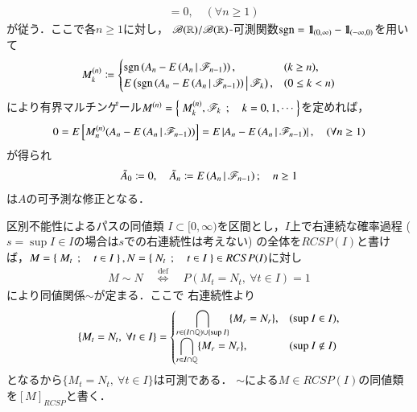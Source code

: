 \begin{prf}
\begin{align}
			&= 0,
			\quad (\forall n \geq 1)
		\end{align}
		が従う．ここで各$n \geq 1$に対し，
		$\mathscr{B}(\mathbb{R})/\mathscr{B}(\mathbb{R})$-可測関数$\operatorname{sgn} = \mbox{1}\hspace{-0.25em}\mbox{l}_{(0,\infty)} - \mbox{1}\hspace{-0.25em}\mbox{l}_{(-\infty,0)}$を用いて
		\begin{align}
			M^{(n)}_k \coloneqq 
			\begin{cases}
				\operatorname{sgn}\left( A_n - E\left( A_n \, \middle|\, \mathscr{F}_{n-1} \right) \right), & (k \geq n), \\
				E\left( \operatorname{sgn}\left( A_n - E\left( A_n \, \middle|\, \mathscr{F}_{n-1} \right) \right) \, \middle|\, \mathscr{F}_k \right), & (0 \leq k < n)
			\end{cases}
		\end{align}
		により有界マルチンゲール$M^{(n)} = \left\{\ M^{(n)}_k,\mathscr{F}_k\ \, ; \quad k=0,1,\cdots\ \right\}$を定めれば，
		\begin{align}
			0 = E\left[ M^{(n)}_n(A_n - E\left( A_n \, \middle|\, \mathscr{F}_{n-1} \right)) \right] 
			= E\left| A_n - E\left( A_n \, \middle|\, \mathscr{F}_{n-1} \right) \right|,
			\quad (\forall n \geq 1)
		\end{align}
		が得られ
		\begin{align}
			\tilde{A}_0 \coloneqq 0,
			\quad \tilde{A}_n \coloneqq E\left( A_n \, \middle|\, \mathscr{F}_{n-1} \right); \quad n \geq 1
		\end{align}
		は$A$の可予測な修正となる．
		\QED
	\end{prf}
	
	\begin{itembox}[l]{区別不能性によるパスの同値類}
		$I \subset [0,\infty)$を区間とし，$I$上で右連続な確率過程
		($s=\sup{}{I} \in I$の場合は$s$での右連続性は考えない)
		の全体を$RCSP(I)$と書けば，$M = \left\{\ M_t\ \, ; \quad t \in I\ \right\},N = \left\{\ N_t\ \, ; \quad t \in I\ \right\} \in RCSP(I)$に対し
		\begin{align}
			M \sim N \quad \overset{\mathrm{def}}{\Longleftrightarrow} \quad 
			P(M_t = N_t,\ \forall t \in I) = 1
			\label{eq:equivalence_with_respect_to_path}
		\end{align}
		により同値関係$\sim$が定まる．ここで
		右連続性より
		\begin{align}
			\{M_t = N_t,\ \forall t \in I\} = 
			\begin{cases}
				\displaystyle \bigcap_{r \in (I \cap \mathbb{Q}) \cup \{\operatorname*{sup}_{} I\}}\{M_r = N_r\}, & (\operatorname*{sup}_{} I \in I), \\
				\displaystyle \bigcap_{r \in I \cap \mathbb{Q}}\{M_r = N_r\}, & (\operatorname*{sup}_{} I \notin I)
			\end{cases}
		\end{align}
		となるから$\{M_t = N_t,\ \forall t \in I\}$は可測である．
		$\sim$による$M \in RCSP(I)$の同値類を$[M]_{RCSP}$と書く．
	\end{itembox}
	
